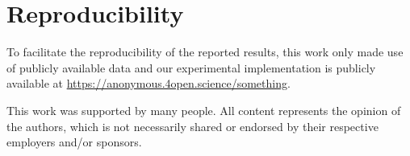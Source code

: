 \documentclass[sigconf,natbib,screen=true,review=true,anonymous]{acmart}
\begin{document}
\maketitle

\acresetall










\section*{Reproducibility}
To facilitate the reproducibility of the reported results, this work only made use of publicly available data and our experimental implementation is publicly available at \url{https://anonymous.4open.science/something}.

\begin{acks}
 This work was supported by many people.
 All content represents the opinion of the authors, which is not necessarily shared or endorsed by their respective employers and/or sponsors.
\end{acks}



\end{document}
